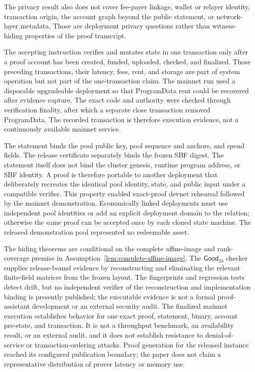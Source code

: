 The privacy result also does not cover fee-payer linkage, wallet or relayer
identity, transaction origin, the account graph beyond the public statement,
or network-layer metadata.  Those are deployment privacy questions rather
than witness-hiding properties of the proof transcript.

The accepting instruction verifies and mutates state in one transaction only
after a proof account has been created, funded, uploaded, checked, and
finalized.  Those preceding transactions, their latency, fees, rent, and
storage are part of system operation but not part of the one-transaction
claim.  The mainnet run used a disposable upgradeable deployment so that
ProgramData rent could be recovered after evidence capture.  The exact code
and authority were checked through verification finality, after which a
separate close transaction removed ProgramData.  The recorded transaction is
therefore execution evidence, not a continuously available mainnet service.

The statement binds the pool public key, pool sequence and anchors, and spend
fields.  The release certificate separately binds the frozen SBF digest.  The
statement itself does not bind the cluster genesis, runtime program address, or
SBF identity.  A proof is therefore portable to another deployment that
deliberately recreates the identical pool identity, state, and public input
under a compatible verifier.  This property enabled exact-proof devnet
rehearsal followed by the mainnet demonstration.  Economically linked
deployments must use independent pool identities or add an explicit deployment
domain to the relation; otherwise the same proof can be accepted once by each
cloned state machine.  The released demonstration pool represented no
redeemable asset.

The hiding theorems are conditional on the complete affine-image and
rank-coverage premise in Assumption~\ref{lem:complete-affine-image}.  The
\(\mathsf{Good}_{23}\) checker supplies release-bound evidence by reconstructing
and eliminating the relevant finite-field matrices from the frozen layout.
The fingerprints and regression tests detect drift, but no independent
verifier of the reconstruction and implementation binding is presently
published; the executable evidence is not a formal proof-assistant
development or an external security audit.
The finalized mainnet execution establishes behavior for one exact proof,
statement, binary, account pre-state, and transaction.  It is not a throughput
benchmark, an availability result, or an external audit, and it does not
establish resistance to denial-of-service or transaction-ordering attacks.
Proof generation for the released instance reached its configured publication
boundary; the paper does not claim a representative distribution of prover
latency or memory use.
